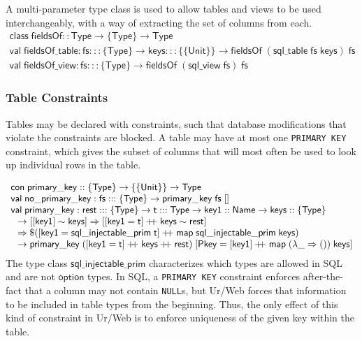 \documentclass{article}
\newcommand{\mt}[1]{\mathsf{#1}}
\newcommand{\rc}{+ \hspace{-.075in} + \;}
\begin{document}
A multi-parameter type class is used to allow tables and views to be used interchangeably, with a way of extracting the set of columns from each.
$$\begin{array}{l}
  \mt{class} \; \mt{fieldsOf} :: \mt{Type} \to \{\mt{Type}\} \to \mt{Type} \\
  \mt{val} \; \mt{fieldsOf\_table} : \mt{fs} ::: \{\mt{Type}\} \to \mt{keys} ::: \{\{\mt{Unit}\}\} \to \mt{fieldsOf} \; (\mt{sql\_table} \; \mt{fs} \; \mt{keys}) \; \mt{fs} \\
  \mt{val} \; \mt{fieldsOf\_view} : \mt{fs} ::: \{\mt{Type}\} \to \mt{fieldsOf} \; (\mt{sql\_view} \; \mt{fs}) \; \mt{fs}
\end{array}$$

\subsubsection{Table Constraints}

Tables may be declared with constraints, such that database modifications that violate the constraints are blocked.  A table may have at most one \texttt{PRIMARY KEY} constraint, which gives the subset of columns that will most often be used to look up individual rows in the table.

$$\begin{array}{l}
  \mt{con} \; \mt{primary\_key} :: \{\mt{Type}\} \to \{\{\mt{Unit}\}\} \to \mt{Type} \\
  \mt{val} \; \mt{no\_primary\_key} : \mt{fs} ::: \{\mt{Type}\} \to \mt{primary\_key} \; \mt{fs} \; [] \\
  \mt{val} \; \mt{primary\_key} : \mt{rest} ::: \{\mt{Type}\} \to \mt{t} ::: \mt{Type} \to \mt{key1} :: \mt{Name} \to \mt{keys} :: \{\mt{Type}\} \\
  \hspace{.1in} \to [[\mt{key1}] \sim \mt{keys}] \Rightarrow [[\mt{key1} = \mt{t}] \rc \mt{keys} \sim \mt{rest}] \\
  \hspace{.1in} \Rightarrow \$([\mt{key1} = \mt{sql\_injectable\_prim} \; \mt{t}] \rc \mt{map} \; \mt{sql\_injectable\_prim} \; \mt{keys}) \\
  \hspace{.1in} \to \mt{primary\_key} \; ([\mt{key1} = \mt{t}] \rc \mt{keys} \rc \mt{rest}) \; [\mt{Pkey} = [\mt{key1}] \rc \mt{map} \; (\lambda \_ \Rightarrow ()) \; \mt{keys}]
\end{array}$$
The type class $\mt{sql\_injectable\_prim}$ characterizes which types are allowed in SQL and are not $\mt{option}$ types.  In SQL, a \texttt{PRIMARY KEY} constraint enforces after-the-fact that a column may not contain \texttt{NULL}s, but Ur/Web forces that information to be included in table types from the beginning.  Thus, the only effect of this kind of constraint in Ur/Web is to enforce uniqueness of the given key within the table.
\end{document}
